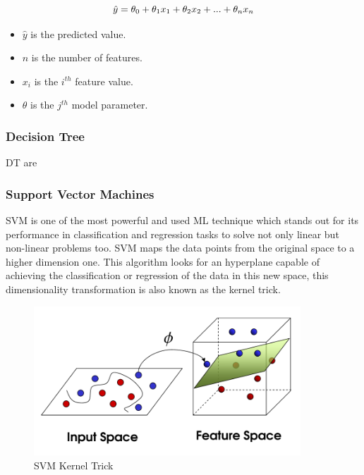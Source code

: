 \begin{equation}
    \hat{y} = \theta_0 + \theta_1 x_1 + \theta_2 x_2 + ...+ \theta_n x_n\\
\end{equation}

\begin{itemize}
    \item \begin{math}\hat{y}\end{math} is the predicted value.
    \item \begin{math}n\end{math} is the number of features.
    \item \begin{math}x_i\end{math} is the \begin{math}i^{th}\end{math} feature value.
    \item \begin{math}\theta\end{math} is the \begin{math}j^{th}\end{math} model parameter.
\end{itemize}

\subsubsection{Decision Tree}
\ac{DT} are 

\subsubsection{Support Vector Machines}

\ac{SVM} is one of the most powerful and used \ac{ML} technique which stands out for its performance in classification and regression tasks to solve not only linear but non-linear problems too. \ac{SVM} maps the data points from the original space to a higher dimension one. This algorithm looks for an hyperplane capable of achieving the classification or regression of the data in this new space, this dimensionality transformation is also known as the kernel trick\cite{Batta2020}.

\begin{figure}[h]
\centering
\includegraphics[width=10cm]{figures/Ch2/SVM-KernelTrick.png}
\caption{SVM Kernel Trick}
\label{f:SVM-kernel-trick}
\end{figure}

